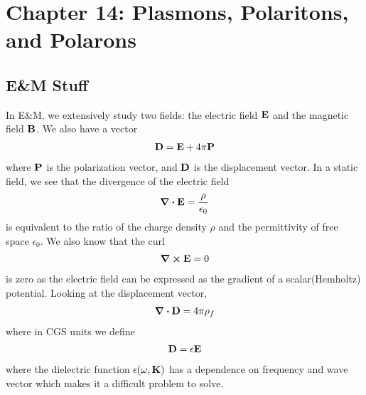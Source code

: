 \documentclass[../main.tex]{subfiles}
\begin{document}
\pagestyle{fancy}

\section*{Chapter 14: Plasmons, Polaritons, and Polarons}

\subsection*{E\&M Stuff} 
In E\&M, we extensively study two fields: the electric field $\vb E$ and the magnetic field $\vb B$.
We also have a vector
\begin{align*}
    \vb D = \vb E + 4\pi \vb P
\end{align*} 
where $\vb P$ is the polarization vector, and $\vb D$ is the displacement vector. In a static field,
we see that the divergence of the electric field
\begin{align*}
    \div \vb E = \frac{\rho}{\epsilon_0}
\end{align*}
is equivalent to the ratio of the charge density $\rho$ and the permittivity of free space
$\epsilon_0$. We also know that the curl
\begin{align*}
    \curl \vb E = 0
\end{align*}
is zero as the electric field can be expressed as the gradient of a scalar(Hemholtz) potential. 
Looking at the displacement vector,
\begin{align*}
    \div \vb D = 4\pi \rho_f
\end{align*}
where in CGS units we define
\begin{align*}
    \vb D = \epsilon \vb E
\end{align*}
where the dielectric function $\epsilon(\omega, \vb K)$ has a dependence on frequency and wave
vector which makes it a difficult problem to solve. 
\end{document}
